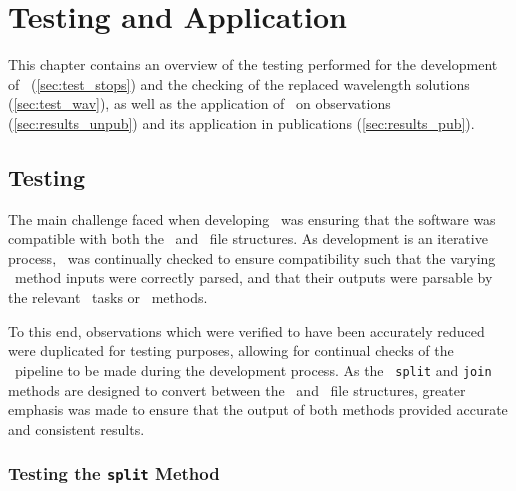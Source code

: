 \chapter{Testing and Application}

This chapter contains an overview of the testing performed for the development of \stops\ (\autoref{sec:test_stops}) and the checking of the replaced wavelength solutions (\autoref{sec:test_wav}), as well as the application of \stops\ on observations (\autoref{sec:results_unpub}) and its application in publications (\autoref{sec:results_pub}).

\section[Testing \textsc{stops}]{Testing \stops} \label{sec:test_stops}

The main challenge faced when developing \stops\ was ensuring that the software was compatible with both the \polsalt\ and \iraf\ file structures. As development is an iterative process, \stops\ was continually checked to ensure compatibility such that the varying \stops\ method inputs were correctly parsed, and that their outputs were parsable by the relevant \iraf\ tasks or \polsalt\ methods.

To this end, observations which were verified to have been accurately reduced were duplicated for testing purposes, allowing for continual checks of the \stops\ pipeline to be made during the development process. As the \stops\ \texttt{split} and \texttt{join} methods are designed to convert between the \polsalt\ and \iraf\ file structures, greater emphasis was made to ensure that the output of both methods provided accurate and consistent results.


\subsection{Testing the \texttt{split} Method} \label{subsec:test_split}

